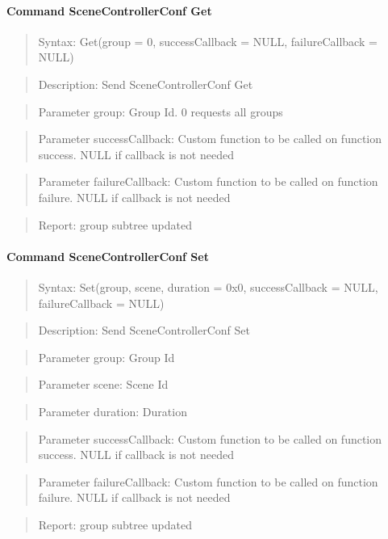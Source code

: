 \paragraph{Command SceneControllerConf Get}
\begin{quote}Syntax: Get(group = 0, successCallback = NULL, failureCallback = NULL)\end{quote}
\begin{quote}Description: Send SceneControllerConf Get\end{quote}
\begin{quote}Parameter group: Group Id. 0 requests all groups\end{quote}
\begin{quote}Parameter successCallback: Custom function to be called on function success. NULL if callback is not needed\end{quote}
\begin{quote}Parameter failureCallback: Custom function to be called on function failure. NULL if callback is not needed\end{quote}
\begin{quote}Report: group subtree updated\end{quote}

\paragraph{Command SceneControllerConf Set}
\begin{quote}Syntax: Set(group, scene, duration = 0x0, successCallback = NULL, failureCallback = NULL)\end{quote}
\begin{quote}Description: Send SceneControllerConf Set\end{quote}
\begin{quote}Parameter group: Group Id\end{quote}
\begin{quote}Parameter scene: Scene Id\end{quote}
\begin{quote}Parameter duration: Duration\end{quote}
\begin{quote}Parameter successCallback: Custom function to be called on function success. NULL if callback is not needed\end{quote}
\begin{quote}Parameter failureCallback: Custom function to be called on function failure. NULL if callback is not needed\end{quote}
\begin{quote}Report: group subtree updated\end{quote}


